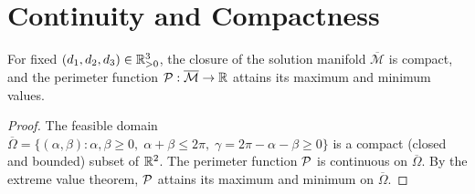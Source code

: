 \section{Continuity and Compactness}

\begin{theorem}
\label{thm:compact-perimeter}
For fixed $(d_1, d_2, d_3) \in \mathbb{R}_{>0}^3$, the closure of the solution manifold $\overline{\mathcal{M}}$ is compact, and the perimeter function $\mathcal{P}: \overline{\mathcal{M}} \to \mathbb{R}$ attains its maximum and minimum values.
\end{theorem}

\begin{proof}
The feasible domain $\overline{\Omega} = \{(\alpha, \beta) : \alpha, \beta \geq 0, \; \alpha + \beta \leq 2\pi, \; \gamma = 2\pi - \alpha - \beta \geq 0\}$ is a compact (closed and bounded) subset of $\mathbb{R}^2$. The perimeter function $\mathcal{P}$ is continuous on $\overline{\Omega}$. By the extreme value theorem, $\mathcal{P}$ attains its maximum and minimum on $\overline{\Omega}$.
\end{proof}

